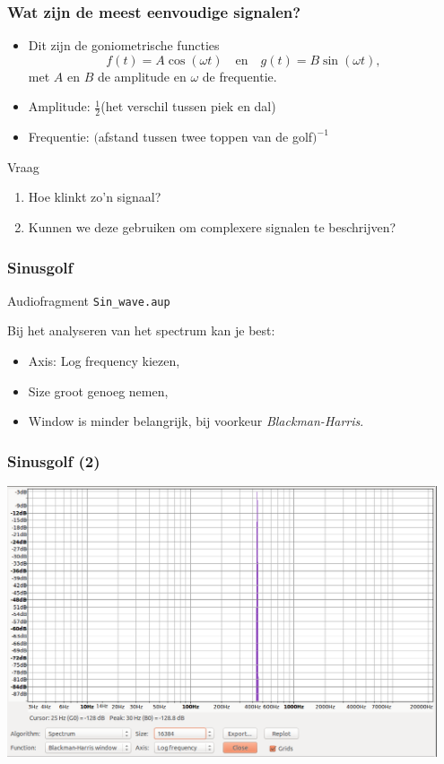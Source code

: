\documentclass[compress, darktitle, framenumber, totalframenumber]{beamer}
\begin{document}
\begin{frame}
\frametitle{Wat zijn de meest eenvoudige signalen?}
\begin{itemize}
\item Dit zijn de goniometrische functies 
\begin{equation*}
f(t)=A\cos (\omega t) \quad \text{en} \quad g(t)=B\sin (\omega t),
\end{equation*} 
met $A$ en $B$ de amplitude en $\omega$ de frequentie. 
\item Amplitude: $\frac{1}{2}$(het verschil tussen piek en dal)
\item Frequentie: $($afstand tussen twee toppen van de golf$)^{-1}$
\end{itemize}
\begin{block}{Vraag}
  \begin{enumerate}
    \item Hoe klinkt zo'n signaal?
    \item Kunnen we deze gebruiken om complexere signalen te beschrijven?  
  \end{enumerate}
\end{block}
\end{frame}

\begin{frame}
\frametitle{Sinusgolf}
\begin{block}{Audiofragment}
\texttt{Sin\_wave.aup}
\end{block}
Bij het analyseren van het spectrum kan je best:
\begin{itemize}
    \item Axis: Log frequency kiezen, 
    \item Size groot genoeg nemen,
    \item Window is minder belangrijk, bij voorkeur {\em Blackman-Harris}. 
  \end{itemize}
\end{frame}

\begin{frame}
\frametitle{Sinusgolf (2)}
\includegraphics[width=0.95\textwidth]{images/SinWave.png}
\end{frame}
\end{document}

